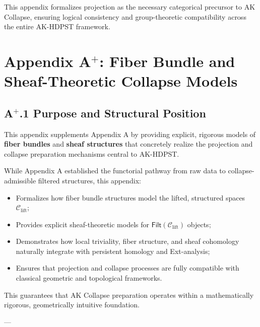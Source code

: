 \documentclass[11pt]{article}
\begin{document}
This appendix formalizes projection as the necessary categorical precursor to AK Collapse, ensuring logical consistency and group-theoretic compatibility across the entire AK-HDPST framework.




\section*{Appendix A$^{+}$: Fiber Bundle and Sheaf-Theoretic Collapse Models}

\subsection*{A$^{+}$.1 Purpose and Structural Position}

This appendix supplements Appendix A by providing explicit, rigorous models of \textbf{fiber bundles} and \textbf{sheaf structures} that concretely realize the projection and collapse preparation mechanisms central to AK-HDPST.

While Appendix A established the functorial pathway from raw data to collapse-admissible filtered structures, this appendix:

\begin{itemize}
    \item Formalizes how fiber bundle structures model the lifted, structured spaces $\mathcal{C}_{\mathrm{lift}}$;
    \item Provides explicit sheaf-theoretic models for $\mathsf{Filt}(\mathcal{C}_{\mathrm{lift}})$ objects;
    \item Demonstrates how local triviality, fiber structure, and sheaf cohomology naturally integrate with persistent homology and Ext-analysis;
    \item Ensures that projection and collapse processes are fully compatible with classical geometric and topological frameworks.
\end{itemize}

This guarantees that AK Collapse preparation operates within a mathematically rigorous, geometrically intuitive foundation.

---
\end{document}
